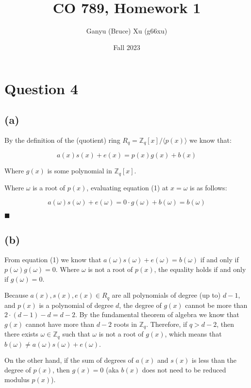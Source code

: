 \documentclass{article}
\title{CO 789, Homework 1}
\author{Ganyu (Bruce) Xu (g66xu)}
\date{Fall 2023}
\begin{document}

\section*{Question 4}

\subsection*{(a)}
By the definition of the (quotient) ring $R_q = \mathbb{Z}_q[x] / \langle p(x) \rangle$ we know that:

\begin{equation}
    a(x)s(x) + e(x) = p(x)g(x) + b(x)
\end{equation}

Where $g(x)$ is some polynomial in $\mathbb{Z}_q[x]$.

Where $\omega$ is a root of $p(x)$, evaluating equation (1) at $x = \omega$ is as follows:

$$
a(\omega)s(\omega) + e(\omega) = 0 \cdot g(\omega) + b(\omega) = b(\omega)
$$

$\blacksquare$

\subsection*{(b)}
From equation (1) we know that $a(\omega)s(\omega) + e(\omega) = b(\omega)$ if and only if $p(\omega)g(\omega) = 0$. Where $\omega$ is not a root of $p(x)$, the equality holds if and only if $g(\omega) = 0$.

Because $a(x), s(x), e(x) \in R_q$ are all polynomials of degree (up to) $d-1$, and $p(x)$ is a polynomial of degree $d$, the degree of $g(x)$ cannot be more than $2 \cdot (d - 1) - d = d - 2$. By the fundamental theorem of algebra we know that $g(x)$ cannot have more than $d-2$ roots in $\mathbb{Z}_q$. Therefore, if $q > d-2$, then there exists $\omega \in \mathbb{Z}_q$ such that $\omega$ is not a root of $g(x)$, which means that $b(\omega) \neq a(\omega)s(\omega) + e(\omega)$.

On the other hand, if the sum of degrees of $a(x)$ and $s(x)$ is less than the degree of $p(x)$, then $g(x) = 0$ (aka $b(x)$ does not need to be reduced modulus $p(x)$).
\end{document}
